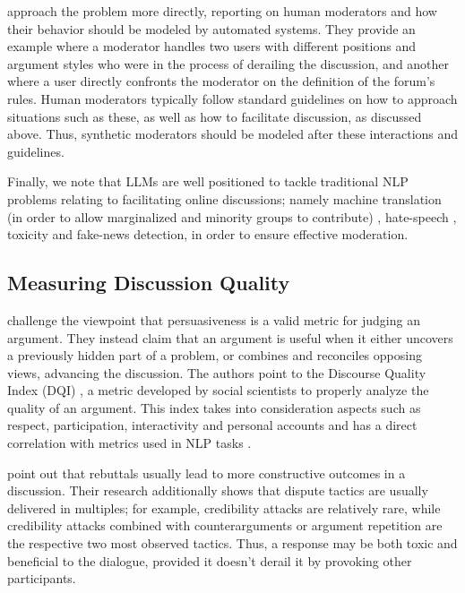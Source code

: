 \citet{vecchi-2021-towards} approach the problem more directly, reporting on human moderators and how their behavior should be modeled by automated systems. They provide an example where a moderator handles two users with different positions and argument styles who were in the process of derailing the discussion, and another where a user directly confronts the moderator on the definition of the forum's rules. Human moderators typically follow standard guidelines on how to approach situations such as these, as well as how to facilitate discussion, as discussed above. Thus, synthetic moderators should be modeled after these interactions and guidelines.

Finally, we note that LLMs are well positioned to tackle traditional \ac{NLP} problems relating to facilitating online discussions; namely machine translation (in order to allow marginalized and minority groups to contribute) \cite{Tsai2024Generative}, hate-speech \cite{Nirmal2024TowardsIH, shi-2024-hatespeech}, toxicity \cite{kang-qian-2024-implanting, Wang2022ToxicityDW} and fake-news \cite{Liu2024DetectIJ, Xu2024ACS} detection, in order to ensure effective moderation. 


\subsection{Measuring Discussion Quality}
\label{sec:related:measures}

\citet{vecchi-2021-towards} challenge the viewpoint that persuasiveness is a valid metric for judging an argument. They instead claim that an argument is useful when it either uncovers a previously hidden part of a problem, or combines and reconciles opposing views, advancing the discussion. The authors point to the Discourse Quality Index (DQI) \cite{Steiner2005-STEDPI-8, stab-gurevych-2017-parsing}, a metric developed by social scientists to properly analyze the quality of an argument. This index takes into consideration aspects such as respect, participation, interactivity and personal accounts and has a direct correlation with metrics used in NLP tasks \cite{wachsmuth-etal-2017-computational}. 

\citet{dekock2022disagree} point out that rebuttals usually lead to more constructive outcomes in a discussion. Their research additionally shows that dispute tactics are usually delivered in multiples; for example, credibility attacks are relatively rare, while credibility attacks combined with counterarguments or argument repetition are the respective two most observed tactics. Thus, a response may be both toxic and beneficial to the dialogue, provided it doesn't derail it by provoking other participants.

